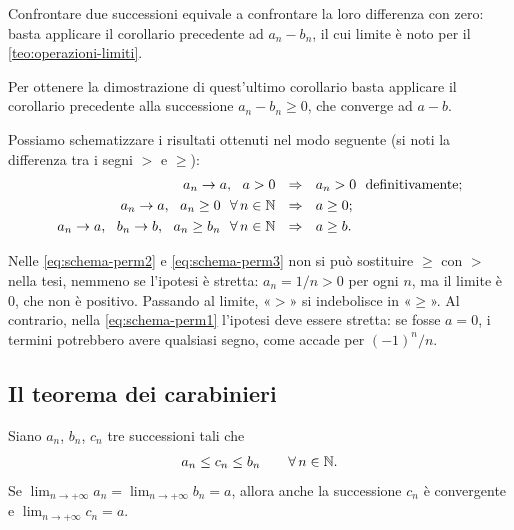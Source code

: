 \begin{strategia}
Confrontare due successioni equivale a confrontare la loro differenza con zero: basta
applicare il corollario precedente ad $a_{n}-b_{n}$, il cui limite è noto per il
\cref{teo:operazioni-limiti}.
\end{strategia}

\begin{dimostrazione}
Per ottenere la dimostrazione di quest'ultimo corollario basta applicare il corollario
precedente alla successione $a_{n}-b_{n}\ge0$, che converge ad $a-b$.
\end{dimostrazione}

Possiamo schematizzare i risultati ottenuti nel modo seguente (si noti la differenza tra
i segni $>$ e $\ge$):
\begin{align}
  a_{n}\to a,\ \ a>0\ \ &\implica\ \ a_{n}>0\ \text{ definitivamente}; \label{eq:schema-perm1}\\
  a_{n}\to a,\ \ a_{n}\ge0\ \ \perogni n\in\N\ \ &\implica\ \ a\ge0; \label{eq:schema-perm2}\\
  a_{n}\to a,\ \ b_{n}\to b,\ \ a_{n}\ge b_{n}\ \ \perogni n\in\N\ \ &\implica\ \ a\ge b. \label{eq:schema-perm3}
\end{align}

\begin{attenzione}
Nelle \eqref{eq:schema-perm2} e \eqref{eq:schema-perm3} non si può sostituire $\ge$ con
$>$ nella tesi, nemmeno se l'ipotesi è stretta: $a_{n}=1/n>0$ per ogni $n$, ma il limite
è $0$, che non è positivo. Passando al limite, «$>$» si indebolisce in «$\ge$». Al
contrario, nella \eqref{eq:schema-perm1} l'ipotesi deve essere stretta: se fosse $a=0$, i
termini potrebbero avere qualsiasi segno, come accade per $(-1)^{n}/n$.
\end{attenzione}

\subsection{Il teorema dei carabinieri}

\begin{teorema}\label{teo:carabinieri}
Siano $a_{n}$, $b_{n}$, $c_{n}$ tre successioni tali che
\begin{equation}\label{eq:carabinieri-ipotesi}
  a_{n}\le c_{n}\le b_{n} \qquad\forall\, n\in\mathbb{N} .
\end{equation}
Se $\displaystyle\lim_{n\to+\infty}a_{n}=\lim_{n\to+\infty}b_{n}=a$, allora anche la
successione $c_{n}$ è convergente e $\displaystyle\lim_{n\to+\infty}c_{n}=a$.
\end{teorema}

